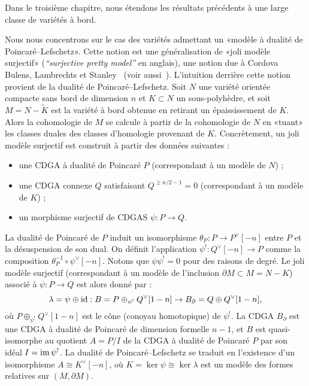 
Dans le troisième chapitre, nous étendons les résultats précédents à une large classe de variétés à bord.

Nous nous concentrons sur le cas des variétés admettant un «modèle à dualité de Poincaré--Lefschetz».
Cette notion est une généralisation de «joli modèle surjectif» (\emph{``surjective pretty model''} en anglais), une notion due à Cordova Bulens, Lambrechts et Stanley~\cite{CordovaBulensLambrechtsStanley2015} (voir aussi~\cite{LambrechtsStanley2005}).
L'intuition derrière cette notion provient de la dualité de Poincaré--Lefschetz.
Soit $N$ une variété orientée compacte sans bord de dimension $n$ et $K \subset N$ un sous-polyhèdre, et soit $M = N - \tilde{K}$ est la variété à bord obtenue en retirant un épaississement de $K$.
Alors la cohomologie de $M$ se calcule à partir de la cohomologie de $N$ en «tuant» les classes duales des classes d'homologie provenant de $K$.
Concrètement, un joli modèle surjectif est construit à partir des données suivantes :
\begin{itemize}
\item une CDGA à dualité de Poincaré $P$ (correspondant à un modèle de $N$) ;
\item une CDGA connexe $Q$ satisfaisant $Q^{\geq n/2 -1} = 0$ (correspondant à un modèle de $K$) ;
\item un morphisme surjectif de CDGAS $\psi : P \to Q$.
\end{itemize}

La dualité de Poincaré de $P$ induit un isomorphisme $\theta_{P} : P \to P^{\vee}[-n]$ entre $P$ et la désuspension de son dual.
On définit l'application $\psi^{!} : Q^{\vee}[-n] \to P$ comme la composition $\theta^{-1}_{P} \circ \psi^{\vee}[-n]$.
Notons que $\psi\psi^{!} = 0$ pour des raisons de degré.
Le joli modèle surjectif (correspondant à un modèle de l'inclusion $\partial M \subset M = N - K$) associé à $\psi : P \to Q$ est alors donné par :
\[ \lambda = \psi \oplus \operatorname{id} : B = P \oplus_{\psi^{!}} Q^{\vee}[1-n] \to B_{\partial} = Q \oplus Q^{\vee}[1-n], \]
où $P \oplus_{\psi^{!}} Q^{\vee}[1-n]$ est le cône (conoyau homotopique) de $\psi^{!}$.
La CDGA $B_{\partial}$ est une CDGA à dualité de Poincaré de dimension formelle $n-1$, et $B$ est quasi-isomorphe au quotient $A = P/I$ de la CDGA à dualité de Poincaré $P$ par son idéal $I = \operatorname{im} \psi^{!}$.
La dualité de Poincaré--Lefschetz se traduit en l'existence d'un isomorphisme $A \cong K^{\vee}[-n]$, où $K = \ker \psi \cong \ker \lambda$ est un modèle des formes relatives sur $(M, \partial M)$.

